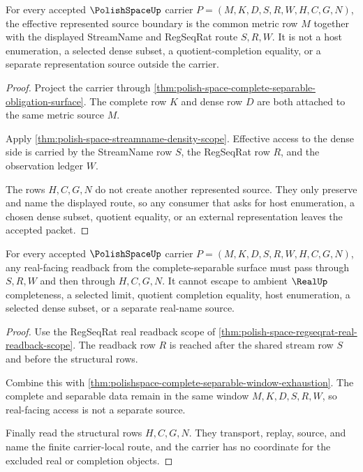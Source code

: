 \begin{theorem}
\label{thm:polishspace-effective-represented-source-boundary}
For every accepted $\PolishSpaceUp$ carrier $P=(M,K,D,S,R,W,H,C,G,N)$, the effective represented source boundary is the common metric row $M$ together with the displayed StreamName and RegSeqRat route $S,R,W$. It is not a host enumeration, a selected dense subset, a quotient-completion equality, or a separate representation source outside the carrier.
\end{theorem}
\begin{proof}
Project the carrier through \autoref{thm:polish-space-complete-separable-obligation-surface}. The complete row $K$ and dense row $D$ are both attached to the same metric source $M$.

Apply \autoref{thm:polish-space-streamname-density-scope}. Effective access to the dense side is carried by the StreamName row $S$, the RegSeqRat row $R$, and the observation ledger $W$.

The rows $H,C,G,N$ do not create another represented source. They only preserve and name the displayed route, so any consumer that asks for host enumeration, a chosen dense subset, quotient equality, or an external representation leaves the accepted packet.
\end{proof}

\begin{theorem}
\label{thm:polishspace-real-regseqrat-readback-nonescape}
For every accepted $\PolishSpaceUp$ carrier $P=(M,K,D,S,R,W,H,C,G,N)$, any real-facing readback from the complete-separable surface must pass through $S,R,W$ and then through $H,C,G,N$. It cannot escape to ambient $\RealUp$ completeness, a selected limit, quotient completion equality, host enumeration, a selected dense subset, or a separate real-name source.
\end{theorem}
\begin{proof}
Use the RegSeqRat real readback scope of \autoref{thm:polish-space-regseqrat-real-readback-scope}. The readback row $R$ is reached after the shared stream row $S$ and before the structural rows.

Combine this with \autoref{thm:polishspace-complete-separable-window-exhaustion}. The complete and separable data remain in the same window $M,K,D,S,R,W$, so real-facing access is not a separate source.

Finally read the structural rows $H,C,G,N$. They transport, replay, source, and name the finite carrier-local route, and the carrier has no coordinate for the excluded real or completion objects.
\end{proof}

